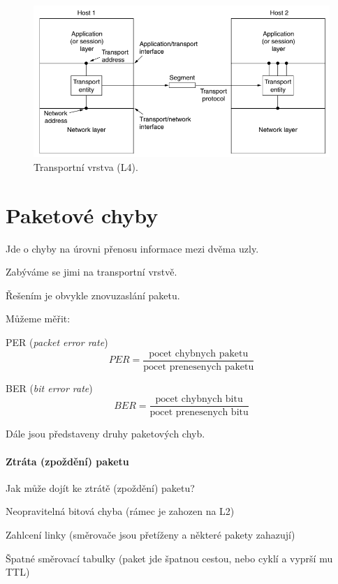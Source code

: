 \begin{figure}[H]
    \centering
    \includegraphics[width=1\linewidth]{l4.png}
    \caption{Transportní vrstva (L4).}
\end{figure}


\section{Paketové chyby}

\begin{compactitem}
    \item Jde o chyby na úrovni přenosu informace mezi dvěma uzly.
    \item Zabýváme se jimi na transportní vrstvě.
    \item Řešením je obvykle znovuzaslání paketu.
    \item Můžeme měřit: \begin{compactitem}
        \item PER (\textit{packet error rate}) $$PER = \frac{\text{pocet chybnych paketu}}{\text{pocet prenesenych paketu}}$$
        \item BER (\textit{bit error rate}) $$BER = \frac{\text{pocet chybnych bitu}}{\text{pocet prenesenych bitu}}$$
    \end{compactitem}
    \item Dále jsou představeny druhy paketových chyb.
\end{compactitem}

\paragraph*{Ztráta (zpoždění) paketu} Jak může dojít ke ztrátě (zpoždění) paketu? \begin{compactitem}
    \item Neopravitelná bitová chyba (rámec je zahozen na L2)
    \item Zahlcení linky (směrovače jsou přetíženy a některé pakety zahazují)
    \item Špatné směrovací tabulky (paket jde špatnou cestou, nebo cyklí a vyprší mu TTL)
\end{compactitem}

